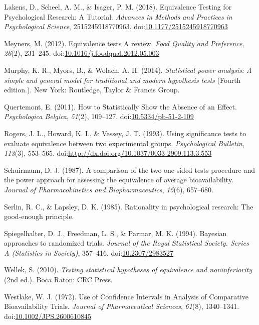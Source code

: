 \documentclass[,man,floatsintext]{apa6}
\begin{document}
\leavevmode\hypertarget{ref-lakens_equivalence_2018}{}%
Lakens, D., Scheel, A. M., \& Isager, P. M. (2018). Equivalence Testing for Psychological Research: A Tutorial. \emph{Advances in Methods and Practices in Psychological Science}, 2515245918770963. doi:\href{https://doi.org/10.1177/2515245918770963}{10.1177/2515245918770963}

\leavevmode\hypertarget{ref-meyners_equivalence_2012}{}%
Meyners, M. (2012). Equivalence tests A review. \emph{Food Quality and Preference}, \emph{26}(2), 231--245. doi:\href{https://doi.org/10.1016/j.foodqual.2012.05.003}{10.1016/j.foodqual.2012.05.003}

\leavevmode\hypertarget{ref-murphy_statistical_2014}{}%
Murphy, K. R., Myors, B., \& Wolach, A. H. (2014). \emph{Statistical power analysis: A simple and general model for traditional and modern hypothesis tests} (Fourth edition.). New York: Routledge, Taylor \& Francis Group.

\leavevmode\hypertarget{ref-quertemont_how_2011}{}%
Quertemont, E. (2011). How to Statistically Show the Absence of an Effect. \emph{Psychologica Belgica}, \emph{51}(2), 109--127. doi:\href{https://doi.org/10.5334/pb-51-2-109}{10.5334/pb-51-2-109}

\leavevmode\hypertarget{ref-rogers_using_1993}{}%
Rogers, J. L., Howard, K. I., \& Vessey, J. T. (1993). Using significance tests to evaluate equivalence between two experimental groups. \emph{Psychological Bulletin}, \emph{113}(3), 553--565. doi:\href{https://doi.org/http://dx.doi.org/10.1037/0033-2909.113.3.553}{http://dx.doi.org/10.1037/0033-2909.113.3.553}

\leavevmode\hypertarget{ref-schuirmann_comparison_1987}{}%
Schuirmann, D. J. (1987). A comparison of the two one-sided tests procedure and the power approach for assessing the equivalence of average bioavailability. \emph{Journal of Pharmacokinetics and Biopharmaceutics}, \emph{15}(6), 657--680.

\leavevmode\hypertarget{ref-serlin_rationality_1985}{}%
Serlin, R. C., \& Lapsley, D. K. (1985). Rationality in psychological research: The good-enough principle.

\leavevmode\hypertarget{ref-spiegelhalter_bayesian_1994}{}%
Spiegelhalter, D. J., Freedman, L. S., \& Parmar, M. K. (1994). Bayesian approaches to randomized trials. \emph{Journal of the Royal Statistical Society. Series A (Statistics in Society)}, 357--416. doi:\href{https://doi.org/10.2307/2983527}{10.2307/2983527}

\leavevmode\hypertarget{ref-wellek_testing_2010}{}%
Wellek, S. (2010). \emph{Testing statistical hypotheses of equivalence and noninferiority} (2nd ed.). Boca Raton: CRC Press.

\leavevmode\hypertarget{ref-westlake_use_1972}{}%
Westlake, W. J. (1972). Use of Confidence Intervals in Analysis of Comparative Bioavailability Trials. \emph{Journal of Pharmaceutical Sciences}, \emph{61}(8), 1340--1341. doi:\href{https://doi.org/10.1002/JPS.2600610845}{10.1002/JPS.2600610845}
\end{document}
